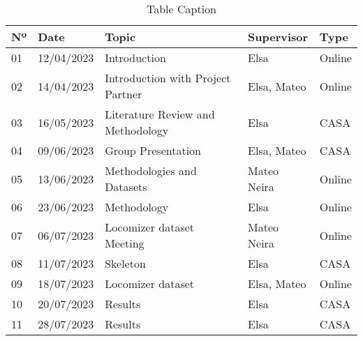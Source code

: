 \begin{table}[h]
\centering
\begin{tabular}{lllll}
\hline
\textbf{Nº} & \textbf{Date} & \textbf{Topic} & \textbf{Supervisor} & \textbf{Type} \\
\hline
01 & 12/04/2023 & Introduction & Elsa & Online \\
02 & 14/04/2023 & Introduction with Project Partner & Elsa, Mateo & Online \\
03 & 16/05/2023 & Literature Review and Methodology & Elsa & CASA \\
04 & 09/06/2023 & Group Presentation & Elsa, Mateo & CASA \\
05 & 13/06/2023 & Methodologies and Datasets & Mateo Neira & Online \\
06 & 23/06/2023 & Methodology & Elsa & Online \\
07 & 06/07/2023 & Locomizer dataset Meeting & Mateo Neira & Online \\
08 & 11/07/2023 & Skeleton & Elsa & CASA \\
09 & 18/07/2023 & Locomizer dataset & Elsa, Mateo & Online \\
10 & 20/07/2023 & Results & Elsa & CASA \\
11 & 28/07/2023 & Results & Elsa & CASA \\
\hline
\end{tabular}
\caption{Table Caption}
\end{table}



